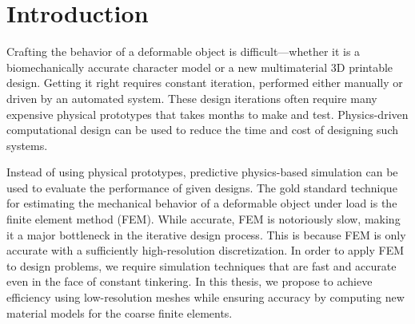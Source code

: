 \chapter{Introduction}
Crafting the behavior of a deformable object is difficult---whether
it is a biomechanically accurate character model or a new multimaterial
3D printable design.
Getting it right requires constant iteration,
performed either manually or driven by an automated system.
These design iterations often require many expensive physical prototypes
that takes months to make and test.
Physics-driven computational design can be used to reduce the time and cost of designing such systems.

Instead of using physical prototypes, predictive physics-based simulation can be used to evaluate the performance of given designs.
The gold standard technique for estimating the mechanical behavior
of a deformable object under load is the finite element method
(FEM).
While accurate, FEM is notoriously slow, making it a major
bottleneck in the iterative design process.
This is because FEM is only accurate with a sufficiently high-resolution discretization.
In order to apply FEM to design problems, we require simulation techniques that are fast and accurate even in the face of constant tinkering.
In this thesis, we propose to achieve efficiency using low-resolution meshes while ensuring accuracy by computing new material models for the coarse finite elements.
